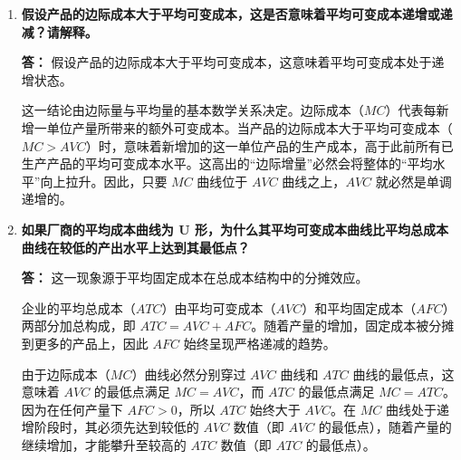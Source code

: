 \begin{enumerate}[label=\textbf{\arabic*.}, leftmargin=*]
\begin{center}
		\end{center}
		
		\item \textbf{假设产品的边际成本大于平均可变成本，这是否意味着平均可变成本递增或递减？请解释。}
		
		\textbf{答：}
		假设产品的边际成本大于平均可变成本，这意味着平均可变成本处于递增状态。
		
		这一结论由边际量与平均量的基本数学关系决定。边际成本（$MC$）代表每新增一单位产量所带来的额外可变成本。当产品的边际成本大于平均可变成本（$MC > AVC$）时，意味着新增加的这一单位产品的生产成本，高于此前所有已生产产品的平均可变成本水平。这高出的“边际增量”必然会将整体的“平均水平”向上拉升。因此，只要 $MC$ 曲线位于 $AVC$ 曲线之上，$AVC$ 就必然是单调递增的。
		
		\item \textbf{如果厂商的平均成本曲线为 U 形，为什么其平均可变成本曲线比平均总成本曲线在较低的产出水平上达到其最低点？}
		
		\textbf{答：}
		这一现象源于平均固定成本在总成本结构中的分摊效应。
		
		企业的平均总成本（$ATC$）由平均可变成本（$AVC$）和平均固定成本（$AFC$）两部分加总构成，即 $ATC = AVC + AFC$。随着产量的增加，固定成本被分摊到更多的产品上，因此 $AFC$ 始终呈现严格递减的趋势。
		
		由于边际成本（$MC$）曲线必然分别穿过 $AVC$ 曲线和 $ATC$ 曲线的最低点，这意味着 $AVC$ 的最低点满足 $MC = AVC$，而 $ATC$ 的最低点满足 $MC = ATC$。因为在任何产量下 $AFC > 0$，所以 $ATC$ 始终大于 $AVC$。在 $MC$ 曲线处于递增阶段时，其必须先达到较低的 $AVC$ 数值（即 $AVC$ 的最低点），随着产量的继续增加，才能攀升至较高的 $ATC$ 数值（即 $ATC$ 的最低点）。
		

\end{enumerate}
